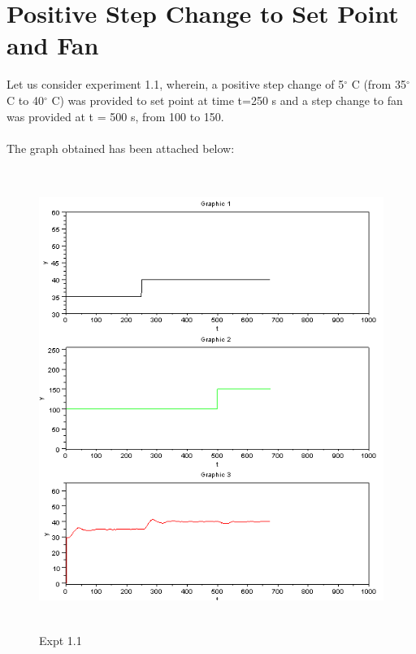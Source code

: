 \section{Positive Step Change to Set Point and Fan}
Let us consider experiment 1.1, wherein, a positive step change of 5$^\circ$ C (from 35$^\circ$ C to 40$^\circ$ C) was provided to set point at time t=250 s and a step change to fan was provided at t = 500 s, from 100 to 150. \\ \\
The graph obtained has been attached below:\\
\begin{figure}[H]
  \includegraphics[width=12cm, height=15cm]{mpc/1_1.png}
  \caption{Expt 1.1}
\end{figure}
